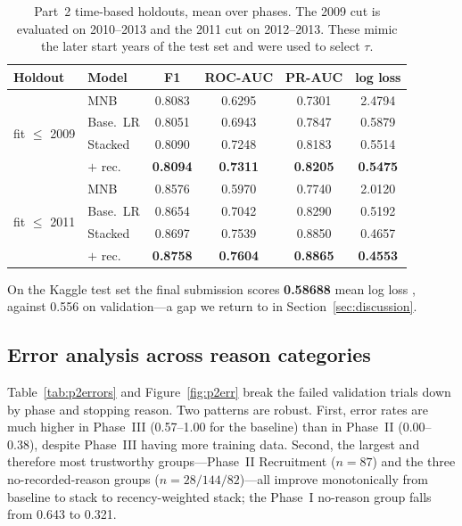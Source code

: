 \begin{table}[t]
\centering\small
\setlength{\tabcolsep}{4pt}
\begin{tabular}{llcccc}
\toprule
Holdout & Model & F1 & ROC-AUC & PR-AUC & log loss \\
\midrule
\multirow{4}{*}{fit $\leq$ 2009}
 & MNB       & 0.8083 & 0.6295 & 0.7301 & 2.4794 \\
 & Base.\ LR & 0.8051 & 0.6943 & 0.7847 & 0.5879 \\
 & Stacked   & 0.8090 & 0.7248 & 0.8183 & 0.5514 \\
 & $+$ rec.  & \textbf{0.8094} & \textbf{0.7311} & \textbf{0.8205} & \textbf{0.5475} \\
\midrule
\multirow{4}{*}{fit $\leq$ 2011}
 & MNB       & 0.8576 & 0.5970 & 0.7740 & 2.0120 \\
 & Base.\ LR & 0.8654 & 0.7042 & 0.8290 & 0.5192 \\
 & Stacked   & 0.8697 & 0.7539 & 0.8850 & 0.4657 \\
 & $+$ rec.  & \textbf{0.8758} & \textbf{0.7604} & \textbf{0.8865} & \textbf{0.4553} \\
\bottomrule
\end{tabular}
\caption{Part~2 time-based holdouts, mean over phases. The 2009 cut is evaluated
on 2010--2013 and the 2011 cut on 2012--2013. These mimic the later start years of
the test set and were used to select $\tau$.}
\label{tab:p2holdout}
\end{table}

On the Kaggle test set the final submission scores \textbf{0.58688} mean log loss
, against 0.556 on validation---a gap we return
to in Section~\ref{sec:discussion}.

\subsection{Error analysis across reason categories}

Table~\ref{tab:p2errors} and Figure~\ref{fig:p2err} break the failed validation
trials down by phase and stopping reason. Two patterns are robust. First, error
rates are much higher in Phase~III (0.57--1.00 for the baseline) than in Phase~II
(0.00--0.38), despite Phase~III having more training data. Second, the largest and
therefore most trustworthy groups---Phase~II Recruitment ($n{=}87$) and the three
no-recorded-reason groups ($n{=}28/144/82$)---all improve monotonically from
baseline to stack to recency-weighted stack; the Phase~I no-reason group falls
from 0.643 to 0.321.

